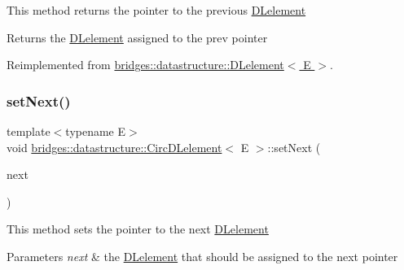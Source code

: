 This method returns the pointer to the previous \hyperlink{classbridges_1_1datastructure_1_1_d_lelement}{D\+Lelement} \begin{DoxyReturn}{Returns}
the \hyperlink{classbridges_1_1datastructure_1_1_d_lelement}{D\+Lelement} assigned to the prev pointer 
\end{DoxyReturn}


Reimplemented from \hyperlink{classbridges_1_1datastructure_1_1_d_lelement_a66917ba9a9270b8f6b5e4ff258bf3e70}{bridges\+::datastructure\+::\+D\+Lelement$<$ E $>$}.

\mbox{\label{classbridges_1_1datastructure_1_1_circ_d_lelement_aa19f430c7b00a6d38187021255f741e4}} 
\subsubsection{\texorpdfstring{set\+Next()}{setNext()}}
{\footnotesize\ttfamily template$<$typename E$>$ \\
void \hyperlink{classbridges_1_1datastructure_1_1_circ_d_lelement}{bridges\+::datastructure\+::\+Circ\+D\+Lelement}$<$ E $>$\+::set\+Next (\begin{DoxyParamCaption}\item[{\hyperlink{classbridges_1_1datastructure_1_1_circ_d_lelement}{Circ\+D\+Lelement}$<$ E $>$ $\ast$}]{next }\end{DoxyParamCaption})\hspace{0.3cm}{\ttfamily [inline]}}

This method sets the pointer to the next \hyperlink{classbridges_1_1datastructure_1_1_d_lelement}{D\+Lelement}


\begin{DoxyParams}{Parameters}
{\em next} & the \hyperlink{classbridges_1_1datastructure_1_1_d_lelement}{D\+Lelement} that should be assigned to the next pointer \\
\hline
\end{DoxyParams}
\mbox{\label{classbridges_1_1datastructure_1_1_circ_d_lelement_ac47b0221a0eebc3c539eec1700f2c776}} 
